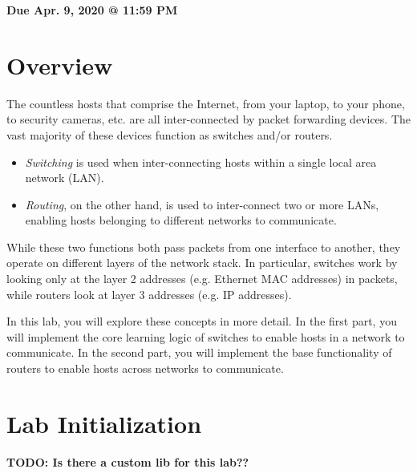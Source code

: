 \documentclass[11pt]{article}
\makeatletter
\def\datedue{Apr. 9, 2020 @ 11:59 PM}
\makeatother
\begin{document}
\maketitle \thispagestyle{fancy}

\hfill {\large \textbf{Due \datedue}}


\section{Overview}
\label{sec:overview}
The countless hosts that comprise the Internet, from your laptop, to your phone, to security cameras, etc. are all inter-connected by packet forwarding devices.
The vast majority of these devices function as switches and/or routers.
\begin{itemize}
    \item \textit{Switching} is used when inter-connecting hosts within a single local area network (LAN).
    \item \textit{Routing}, on the other hand, is used to inter-connect two or more LANs, enabling hosts belonging to different networks to communicate.
\end{itemize}
While these two functions both pass packets from one interface to another, they operate on different layers of the network stack.
In particular, switches work by looking only at the layer 2 addresses (e.g. Ethernet MAC addresses) in packets, while routers look at layer 3 addresses (e.g. IP addresses).

In this lab, you will explore these concepts in more detail.
In the first part, you will implement the core learning logic of switches to enable hosts in a network to communicate.
In the second part, you will implement the base functionality of routers to enable hosts across networks to communicate.

\section{Lab Initialization}
\label{sec:lab-init}
\textbf{TODO: Is there a custom lib for this lab??}
\end{document}
